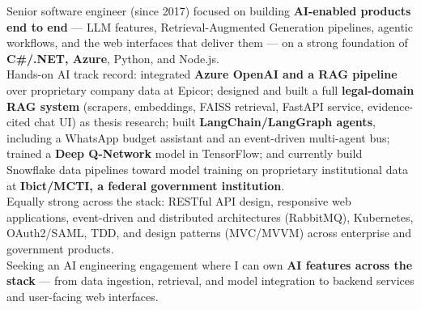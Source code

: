 \documentclass[10pt,a4paper]{altacv}
\begin{document}

%

\begin{fullwidth}
\makecvheader
\end{fullwidth}

%


Senior software engineer (since 2017) focused on building \textbf{AI-enabled products end to end} — LLM features, Retrieval-Augmented Generation pipelines, agentic workflows, and the web interfaces that deliver them — on a strong foundation of \textbf{C\#/.NET, Azure}, Python, and Node.js. \\

Hands-on AI track record: integrated \textbf{Azure OpenAI and a RAG pipeline} over proprietary company data at Epicor; designed and built a full \textbf{legal-domain RAG system} (scrapers, embeddings, FAISS retrieval, FastAPI service, evidence-cited chat UI) as thesis research; built \textbf{LangChain/LangGraph agents}, including a WhatsApp budget assistant and an event-driven multi-agent bus; trained a \textbf{Deep Q-Network} model in TensorFlow; and currently build Snowflake data pipelines toward model training on proprietary institutional data at \textbf{Ibict/MCTI, a federal government institution}. \\

Equally strong across the stack: RESTful API design, responsive web applications, event-driven and distributed architectures (RabbitMQ), Kubernetes, OAuth2/SAML, TDD, and design patterns (MVC/MVVM) across enterprise and government products. \\

Seeking an AI engineering engagement where I can own \textbf{AI features across the stack} — from data ingestion, retrieval, and model integration to backend services and user-facing web interfaces. \\
\end{document}

